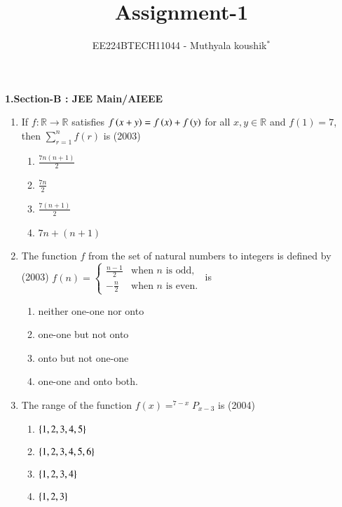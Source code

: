 \documentclass[journal,12pt,twocolumn]{IEEEtran}
\theoremstyle{remark}
\begin{document}

\vspace{3cm}

\title{Assignment-1}
\author{EE224BTECH11044 - Muthyala koushik$^{*}$%
}
\maketitle
\newpage
\bigskip

\renewcommand{\thefigure}{\theenumi}
\renewcommand{\thetable}{\theenumi}

\textbf{1.Section-B : JEE Main/AIEEE}
\begin{enumerate}[start=4]
	\item If $f: \mathbb{R} \to \mathbb{R}$ satisfies $f\left(x+y\right) = f\left(x\right) + f\left(y\right)$ for all $x, y \in \mathbb{R}$ and $f(1) = 7$, then $\sum_{r=1}^n f(r)$ is \hfill(2003)
		
    \begin{enumerate}
        \item $\frac{7n(n+1)}{2}$\\
        \item $\frac{7n}{2}$\\
        \item $\frac{7(n+1)}{2}$\\
        \item $7n + (n+1)$
    \end{enumerate}

    \item The function $f$ from the set of natural numbers to integers is defined by \hfill(2003)
               $f(n) = \begin{cases} \frac{n-1}{2} & \text{when } n \text{ is odd}, \\-\frac{n}{2} & \text{when } n \text{ is even}.\end{cases}$ is

	\begin{enumerate}
		\item neither one-one nor onto
		\item one-one but not onto
		\item onto but not one-one
		\item one-one and onto both.
	\end{enumerate} 

\item The range of the function $f(x)=^{7-x}P_{x-3}$ is \hfill(2004)
	\begin{enumerate}
		\item $\left\{1,2,3,4,5\right\}$
		\item $\left\{1,2,3,4,5,6\right\}$
		\item $\left\{1,2,3,4\right\}$
		\item $\left\{1,2,3\right\}$
	\end{enumerate}


\end{enumerate}
\end{document}
